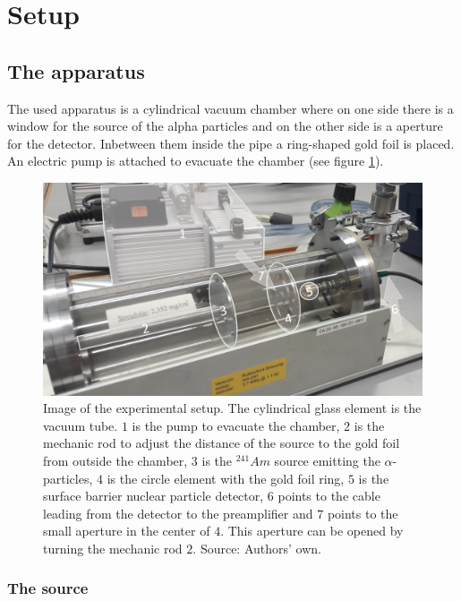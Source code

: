 \documentclass[a4paper]{article}
\begin{document}
\section{Setup}

\subsection{The apparatus}

The used apparatus is a cylindrical vacuum chamber where on one side there is a window for the source of the alpha particles and on the other side is a aperture for the detector. Inbetween them inside the pipe a ring-shaped gold foil is placed. An electric pump is attached to evacuate the chamber (see figure \ref{fig:setup}).

\begin{figure}[H]
\captionsetup{singlelinecheck=off}
\centering
\includegraphics[width=1.0\textwidth]{img/setup.jpg}
\caption[blubb]{Image of the experimental setup. The cylindrical glass element is the vacuum tube. $1$ is the pump to evacuate the chamber, $2$ is the mechanic rod to adjust the distance of the source to the gold foil from outside the chamber, $3$ is the $^{241}Am$ source emitting the $\alpha$-particles, $4$ is the circle element with the gold foil ring, $5$ is the surface barrier nuclear particle detector, $6$ points to the cable leading from the detector to the preamplifier and $7$ points to the small aperture in the center of $4$. This aperture can be opened by turning the mechanic rod $2$. Source: Authors' own.}
\label{fig:setup}
\end{figure}

\subsubsection{The source}
\end{document}
